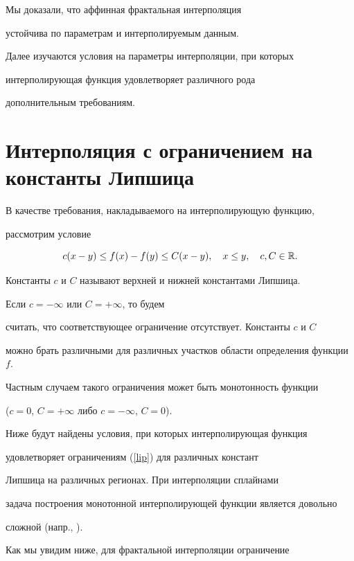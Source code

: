 Мы доказали, что аффинная фрактальная интерполяция


устойчива по параметрам и интерполируемым данным.


Далее изучаются условия на параметры интерполяции, при которых


интерполирующая функция удовлетворяет различного рода


дополнительным требованиям.





\section{Интерполяция с ограничением на константы Липшица}





В качестве требования, накладываемого на интерполирующую функцию,


рассмотрим условие


\begin{equation} \label{lip}


c(x-y) \le f(x) - f(y) \le C (x-y),\quad x \le y, \quad c,C \in \R.


\end{equation}


Константы $c$ и $C$ называют верхней и нижней константами Липшица.


Если $c=-\infty$ или $C=+\infty$, то будем


считать, что соответствующее ограничение отсутствует. Константы $c$ и $C$


можно брать различными для различных участков области определения функции $f$.


Частным случаем такого ограничения может быть монотонность функции


($c=0$, $C=+\infty$ либо $c=-\infty$, $C=0$).





Ниже будут найдены условия, при которых интерполирующая функция


удовлетворяет ограничениям (\ref{lip}) для различных констант


Липшица на различных регионах. При интерполяции сплайнами


задача построения монотонной интерполирующей функции является довольно


сложной (напр., \cite{mon_spl}).


Как мы увидим ниже, для фрактальной интерполяции ограничение



